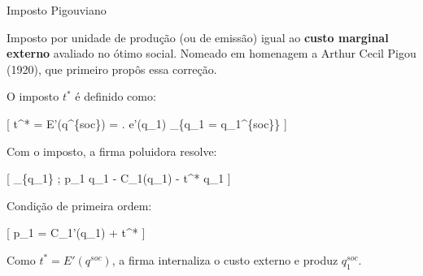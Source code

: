 \documentclass[11pt,twoside,openright]{book}
\begin{document}
\begin{definitionbox}{Imposto Pigouviano}

Imposto por unidade de produção (ou de emissão) igual ao \textbf{custo
marginal externo} avaliado no ótimo social. Nomeado em homenagem a
Arthur Cecil Pigou (1920), que primeiro propôs essa correção.

\end{definitionbox}

O imposto \(t^*\) é definido como:

{[} t\^{}* = E'(q\^{}\{soc\}) = \left. 
\cdot e'(q\_1) \right\textbar\_\{q\_1 = q\_1\^{}\{soc\}\}
\label{eq:20.8}  {]}

Com o imposto, a firma poluidora resolve:

{[} \max\_\{q\_1\} ; p\_1 q\_1 - C\_1(q\_1) - t\^{}* q\_1 {]}

Condição de primeira ordem:

{[} p\_1 = C\_1'(q\_1) + t\^{}* \label{eq:20.9}  {]}

Como \(t^* = E'(q^{soc})\), a firma internaliza o custo externo e produz
\(q_1^{soc}\).
\end{document}
